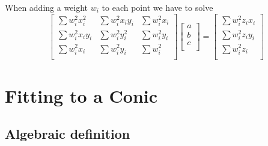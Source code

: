 \documentclass[aps]{revtex4}
\begin{document}
When adding a weight $w_i$ to each point we have to solve
\begin{equation}
	\label{eq:circ}
	\begin{bmatrix}
	\sum w_i^2 x_i^2 & \sum w_i^2 x_iy_i & \sum w_i^2 x_i\\
	\sum w_i^2 x_iy_i & \sum w_i^2 y_i^2 & \sum w_i^2 y_i\\
	\sum w_i^2x_i    & \sum w_i^2y_i & \sum w_i^2 \\
	\end{bmatrix}
	\begin{bmatrix}
	a\\
	b\\
	c\\
	\end{bmatrix}
	=
	\begin{bmatrix}
	\sum w_i^2z_i x_i\\
	\sum w_i^2z_i y_i\\
	\sum w_i^2z_i\\
	\end{bmatrix}
\end{equation}

\section{Fitting to a Conic}
\subsection{Algebraic definition}
	
\end{document}
